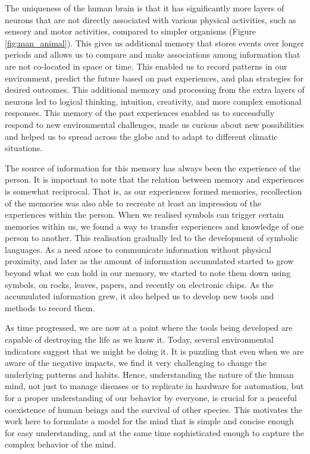 \documentclass[reprint,amsmath,amssymb,apr,aip,onecolumn, 11pt]{revtex4-1}
\begin{document}
	The uniqueness of the human brain is that it has significantly more layers of neurons that are not directly associated with various physical activities, such as sensory and motor activities, compared to simpler organisms\cite{2014_Hofman, 2011_DeFelipe} (Figure \ref{fig:man_animal}). This gives us additional memory that stores events over longer periods and allows us to compare and make associations among information that are not co-located in space or time. This enabled us to record patterns in our environment, predict the future based on past experiences, and plan strategies for desired outcomes. This additional memory and processing from the extra layers of neurons led to logical thinking, intuition, creativity, and more complex emotional responses. This memory of the past experiences enabled us to successfully respond to new environmental challenges, made us curious about new possibilities and helped us to spread across the globe and to adapt to different climatic situations. 
	
	
	
	The source of information for this memory has always been the experience of the person. It is important to note that the relation between memory and experiences is somewhat reciprocal\cite{Canli_2000, Tyng_2017}. That is, as our experiences formed memories, recollection of the memories was also able to recreate at least an impression of the experiences within the person.  When we realised symbols can trigger certain memories within us, we found a way to transfer experiences and knowledge of one person to another. This realisation gradually led to the development of symbolic languages. As a need arose to communicate information without physical proximity, and later as the amount of information accumulated started to grow beyond what we can hold in our memory, we started to note them down using symbols, on rocks, leaves, papers, and recently on electronic chips. As the accumulated information grew, it also helped us to develop new tools and methods to record them.
	
	As time progressed, we are now at a point where the tools being developed are capable of destroying the life as we know it. Today, several environmental indicators suggest that we might be doing it. It is puzzling that even when we are aware of the negative impacts, we find it very challenging to change the underlying patterns and habits. Hence, understanding the nature of the human mind, not just to manage diseases or to replicate in hardware for automation, but for a proper understanding of our behavior by everyone, is crucial for a peaceful coexistence of human beings and the survival of other species. This motivates the work here to formulate a model for the mind that is simple and concise enough for easy understanding, and at the same time sophisticated enough to capture the complex behavior of the mind. 
	
\end{document}
